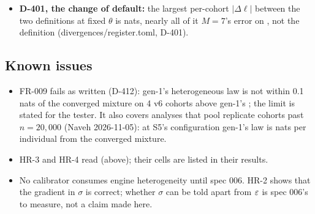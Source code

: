 \begin{itemize}[nosep]
     of cells within
    $[0.5,2]$ of the stated CPU and a median ratio
    .
  \item \textbf{D-401, the change of default:} the largest per-cohort $|\Delta\ell|$ between the two definitions at
    fixed $\theta$ is  nats, nearly all
    of it $M=7$'s error on , not the definition (divergences/register.toml, D-401).
\end{itemize}

\subsection{Known issues}\label{sec:het-issues}

\begin{itemize}[nosep]
  \item FR-009 fails as written (D-412): gen-1's heterogeneous law is not within 0.1 nats of the converged mixture on 4
    v6 cohorts above gen-1's ; the limit is stated for the tester. It also covers analyses that pool
    replicate cohorts past $n=20{,}000$ (Naveh 2026-11-05): at S5's configuration gen-1's law is
     nats per individual from the converged
    mixture.
  \item HR-3 and HR-4 read  (above); their cells are listed in their results.
  \item No calibrator consumes engine heterogeneity until spec 006. HR-2 shows that the gradient in $\sigma$ is
    correct; whether $\sigma$ can be told apart from $\varepsilon$ is spec 006's to measure, not a claim made here.
\end{itemize}
